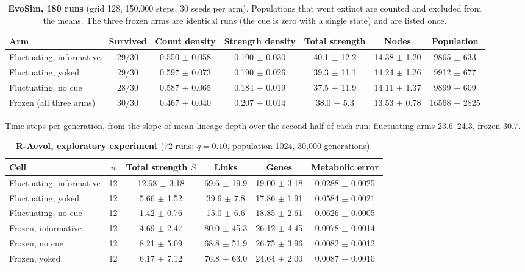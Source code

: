 \begin{table}[!ht]\small
\caption{\textbf{EvoSim, 180 runs} (grid 128, 150{,}000 steps, 30 seeds per arm).
Populations that went extinct are counted and excluded from the means. The three
frozen arms are identical runs (the cue is zero with a single state) and are
listed once.}
\begin{tabular}{@{}lcccccc@{}}\toprule
Arm & Survived & Count density & Strength density & Total strength & Nodes & Population\\\midrule

Fluctuating, informative & 29/30 & 0.550 $\pm$ 0.058 & 0.190 $\pm$ 0.030 & 40.1 $\pm$ 12.2 & 14.38 $\pm$ 1.20 & 9865 $\pm$ 633\\

Fluctuating, yoked & 29/30 & 0.597 $\pm$ 0.073 & 0.190 $\pm$ 0.026 & 39.3 $\pm$ 11.1 & 14.24 $\pm$ 1.26 & 9912 $\pm$ 677\\

Fluctuating, no cue & 28/30 & 0.587 $\pm$ 0.065 & 0.184 $\pm$ 0.019 & 37.5 $\pm$ 11.9 & 14.11 $\pm$ 1.37 & 9899 $\pm$ 609\\

Frozen (all three arms) & 30/30 & 0.467 $\pm$ 0.040 & 0.207 $\pm$ 0.014 & 38.0 $\pm$ 5.3 & 13.53 $\pm$ 0.78 & 16568 $\pm$ 2825\\

\bottomrule\end{tabular}
\par\footnotesize Time steps per generation, from the slope of mean lineage depth
over the second half of each run: fluctuating arms 23.6--24.3, frozen 30.7.
\end{table}

\begin{table}[!ht]\small
\caption{\textbf{R-Aevol, exploratory experiment} (72 runs; $q=0.10$, population 1024, 30{,}000 generations).}
\begin{tabular}{@{}lccccc@{}}\toprule
Cell & $n$ & Total strength $S$ & Links & Genes & Metabolic error\\\midrule
Fluctuating, informative & 12 & 12.68 $\pm$ 3.18 & 69.6 $\pm$ 19.9 & 19.00 $\pm$ 3.18 & 0.0288 $\pm$ 0.0025\\
Fluctuating, yoked & 12 & 5.66 $\pm$ 1.52 & 39.6 $\pm$ 7.8 & 17.86 $\pm$ 1.91 & 0.0584 $\pm$ 0.0021\\
Fluctuating, no cue & 12 & 1.42 $\pm$ 0.76 & 15.0 $\pm$ 6.6 & 18.85 $\pm$ 2.61 & 0.0626 $\pm$ 0.0005\\
Frozen, informative & 12 & 4.69 $\pm$ 2.47 & 80.0 $\pm$ 45.3 & 26.12 $\pm$ 4.45 & 0.0078 $\pm$ 0.0014\\
Frozen, no cue & 12 & 8.21 $\pm$ 5.09 & 68.8 $\pm$ 51.9 & 26.75 $\pm$ 3.96 & 0.0082 $\pm$ 0.0012\\
Frozen, yoked & 12 & 6.17 $\pm$ 7.12 & 76.8 $\pm$ 63.0 & 24.64 $\pm$ 2.00 & 0.0087 $\pm$ 0.0010\\
\bottomrule\end{tabular}\end{table}

